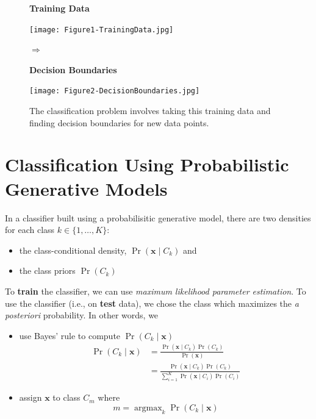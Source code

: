 \documentclass[11pt]{article}
\DeclareMathOperator*{\argmax}{argmax}
\newcommand{\xb}{\mathbf{x}}
\begin{document}
\begin{figure}[h]
\begin{minipage}{0.45\textwidth}
\textbf{Training Data}

\texttt{[image: Figure1-TrainingData.jpg]}
\end{minipage} \hfill
\begin{minipage}{0.05\textwidth}
\begin{center}
{\Huge $\Rightarrow$}
\end{center}
\end{minipage}
\hfill
\begin{minipage}{0.45\textwidth}
\textbf{Decision Boundaries}

\texttt{[image: Figure2-DecisionBoundaries.jpg]}
\end{minipage}
\caption{The classification problem involves taking this training data and finding decision boundaries for new data points.}
\end{figure}




\section{Classification Using Probabilistic Generative Models}
In a classifier built using a probabilisitic generative model, there are two densities for each class $k \in \lbrace 1, \ldots, K\rbrace$:
\begin{itemize}
\item the class-conditional density, $\Pr \left(\xb \mid C_k\right)$ and
\item the class priors $\Pr \left(C_k\right)$
\end{itemize}

To \textbf{train} the classifier, we can use \textit{maximum likelihood parameter estimation}. To use the classifier (i.e., on \textbf{test} data), we chose the class which maximizes the \textit{a posteriori} probability. In other words, we
\begin{itemize}
\item use Bayes' rule to compute $\Pr \left(C_k \mid \xb\right)$
\begin{equation}
    \begin{split}
        \Pr \left(C_k \mid \xb\right) &= \frac{\Pr\left(\xb \mid C_k\right) \Pr\left(C_k\right)}{\Pr\left(\xb\right)} \\
                    &= \frac{\Pr\left(\xb \mid C_k\right) \Pr\left(C_k\right)}{\sum_{i=1}^{K} \Pr\left(\xb \mid C_i\right) \Pr\left(C_i\right)} 
    \end{split}
\end{equation}

\item assign $\xb$ to class $C_m$ where
\begin{equation}
	m = \argmax_k \Pr \left(C_k \mid \xb\right)
 \end{equation}
\end{itemize}
\end{document}
